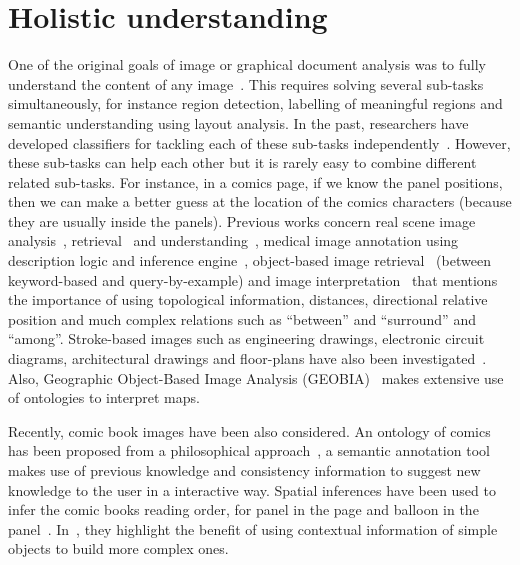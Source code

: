 \section{Holistic understanding} %
\label{sec:sota:holistic_understanding}

One of the original goals of image or graphical document analysis was to fully understand the content of any image~\cite{Lamiroy2014Handbook}.
This requires solving several sub-tasks simultaneously, for instance region detection, labelling of meaningful regions and semantic understanding using layout analysis.
In the past, researchers have developed classifiers for tackling each of these sub-tasks independently~\cite{Mao2003Document}.
However, these sub-tasks can help each other but it is rarely easy to combine different related sub-tasks.
For instance, in a comics page, if we know the panel positions, then we can make a better guess at the location of the comics characters (because they are usually inside the panels).
Previous works concern real scene image analysis~\cite{Blaschke2014Geographic}, retrieval~\cite{Sciascio2011Structured} and understanding~\cite{Li2012Toward,Fidler2012Describing}, medical image annotation using description logic and inference engine~\cite{Hu2003Ontology}, object-based image retrieval~\cite{Mezaris03anontology,Sarwar2013Ontology} (between keyword-based and query-by-example) and image interpretation~\cite{Hudelot2008Fuzzy,Ogier2000Semantic} that mentions the importance of using topological information, distances, directional relative position and much complex relations such as ``between'' and ``surround'' and ``among''.
Stroke-based images such as engineering drawings, electronic circuit diagrams, architectural drawings and floor-plans have also been investigated~\cite{pasternak1994processing,pasternak1995Taxonomy,Dosch2000complete}.
Also, Geographic Object-Based Image Analysis (GEOBIA)~\cite{Blaschke2014Geographic} makes extensive use of ontologies to interpret maps.


Recently, comic book images have been also considered.
An ontology of comics has been proposed from a philosophical approach~\cite{Aaron2011}, a semantic annotation tool~\cite{Hermann2012Guided} makes use of previous knowledge and consistency information to suggest new knowledge to the user in a interactive way.
Spatial inferences have been used to infer the comic books reading order, for panel in the page and balloon in the panel~\cite{Guerin2012Ontologies}. 
In~\cite{Sciascio2011Structured}, they highlight the benefit of using contextual information of simple objects to build more complex ones.

